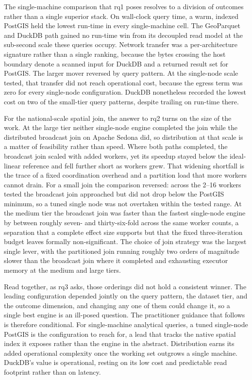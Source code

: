 The single-machine comparison that \acrshort{rq}1 poses resolves to a division of outcomes rather than a single superior stack. On wall-clock query time, a warm, indexed PostGIS held the lowest run-time in every single-machine cell. The GeoParquet and DuckDB path gained no run-time win from its decoupled read model at the sub-second scale these queries occupy. Network transfer was a per-architecture signature rather than a single ranking, because the bytes crossing the host boundary denote a scanned input for DuckDB and a returned result set for PostGIS. The larger mover reversed by query pattern. At the single-node scale tested, that transfer did not reach operational cost, because the egress term was zero for every single-node configuration. DuckDB nonetheless recorded the lowest cost on two of the small-tier query patterns, despite trailing on run-time there.

For the national-scale spatial join, the answer to \acrshort{rq}2 turns on the size of the work. At the large tier neither single-node engine completed the join while the distributed broadcast join on Apache Sedona did, so distribution at that scale is a matter of feasibility rather than speed. Where both paths completed, the broadcast join scaled with added workers, yet its speedup stayed below the ideal-linear reference and fell further short as workers grew. That widening shortfall is the trace of a fixed coordination overhead and a partition load that more workers cannot drain. For a small join the comparison reversed: across the 2--16 workers tested the broadcast join approached but did not drop below the PostGIS minimum, so a tuned single node was not overtaken within the tested range. At the medium tier the broadcast join was faster than the fastest single-node engine by between roughly seven- and thirty-six-fold across the same worker counts, a separation that a complete effect size supports but that the fixed three-iteration budget leaves formally non-significant. The choice of join strategy was the largest single lever, with the partitioned join running roughly two orders of magnitude slower than the broadcast join where it completed and exhausting executor memory at the medium and large tiers.

Read together, as \acrshort{rq}3 asks, those orderings did not hold a consistent winner. The leading configuration depended jointly on the query pattern, the dataset tier, and the outcome dimension, and changing any one of them could change it, so a single best engine is an ill-posed question. The practitioner guidance that follows is therefore conditional. For single-machine analytical queries, a tuned single-node PostGIS is the configuration to reach for, a lead that tracks the native spatial index it exposes rather than the engine in the abstract. Distribution earns its added operational complexity once the working set outgrows a single machine. DuckDB's value is operational, resting on its low cost and predictable read footprint rather than on latency.

